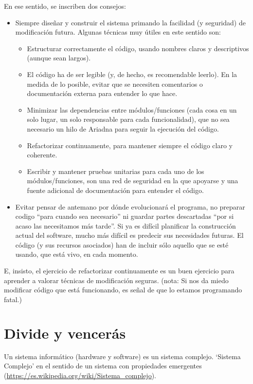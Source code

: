 \documentclass[spanish,12pt,a4paper,final,oneside]{book}
\begin{document}
En ese sentido, se inscriben dos consejos:
\begin{itemize}
\item Siempre diseñar y construir el sistema primando la facilidad (y seguridad) de modificación futura. Algunas técnicas muy útiles en este sentido son:
\begin{itemize}
\item Estructurar correctamente el código, usando nombres claros y descriptivos (aunque sean largos).
\item El código ha de ser legible (y, de hecho, es recomendable leerlo). En la medida de lo posible, evitar que se necesiten comentarios o documentación externa para entender lo que hace.
\item Minimizar las dependencias entre módulos/funciones (cada cosa en un solo lugar, un solo responsable para cada funcionalidad), que no sea necesario un hilo de Ariadna para seguir la ejecución del código. 
\item Refactorizar continuamente, para mantener siempre el código claro y coherente.
\item Escribir y mantener pruebas unitarias para cada uno de los módulos/funciones, son una red de seguridad en la que apoyarse y una fuente adicional de documentación para entender el código.
\end{itemize}
\item Evitar pensar de antemano por dónde evolucionará el programa, no preparar codigo ``para cuando sea necesario'' ni guardar partes descartadas ``por si acaso las necesitamos más tarde''. Si ya es difícil planificar la construcción actual del software, mucho más difícil es predecir sus necesidades futuras. El código (y sus recursos asociados) han de incluir sólo aquello que se esté usando, que está vivo, en cada momento. 
\end{itemize}

E, insisto, el ejercicio de refactorizar continuamente es un buen ejercicio para aprender a valorar técnicas de modificación seguras. (nota: Si nos da miedo modificar código que está funcionando, es señal de que lo estamos programando fatal.)


\section{Divide y vencerás}
Un sistema informático (hardware y software) es un sistema complejo. `Sistema Complejo' en el sentido de un sistema con propiedades emergentes (\url{https://es.wikipedia.org/wiki/Sistema_complejo}).
\end{document}
